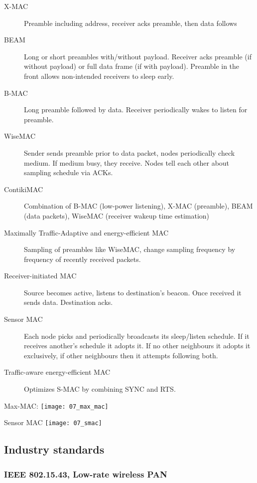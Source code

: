 \begin{description}
		\item[X-MAC] Preamble including address, receiver acks preamble, then data follows
		\item[BEAM] Long or short preambles with/without payload. Receiver acks
				preamble (if without payload) or full data frame (if with
				payload). Preamble in the front allows non-intended receivers
				to sleep early.
		\item[B-MAC] Long preamble followed by data. Receiver periodically
				wakes to listen for preamble.
		\item[WiseMAC] Sender sends preamble prior to data packet, nodes
				periodically check medium. If medium busy, they receive. Nodes
				tell each other about sampling schedule via ACKs.
		\item[ContikiMAC] Combination of B-MAC (low-power listening), X-MAC
				(preamble), BEAM (data packets), WiseMAC (receiver wakeup time
				estimation)
		\item[Maximally Traffic-Adaptive and energy-efficient MAC] Sampling of
				preambles like WiseMAC, change sampling frequency by frequency
				of recently received packets.
		\item[Receiver-initiated MAC] Source becomes active, listens to
				destination's beacon. Once received it sends data. Destination
				acks.
		\item[Sensor MAC] Each node picks and periodically broadcasts its
				sleep/listen schedule. If it receives another's schedule it
				adopts it. If no other neighbours it adopts it exclusively, if
				other neighbours then it attempts following both.
		\item[Traffic-aware energy-efficient MAC] Optimizes S-MAC by combining
				SYNC and RTS.
\end{description}

Max-MAC:
\texttt{[image: 07\_max\_mac]}

Sensor MAC
\texttt{[image: 07\_smac]}

\subsection{Industry standards}

\subsubsection{IEEE 802.15.43, Low-rate wireless PAN}

